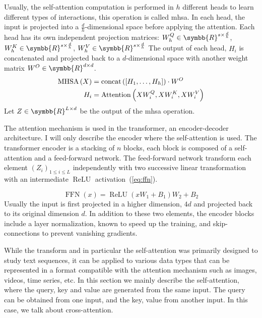 \documentclass[../main.tex]{subfiles}
\begin{document}
	 Usually, the self-attention computation is performed in \(h\) different heads to learn different types of interactions, this operation is called \gls{mhsa}.
	 In each head, the input is projected into a \(\frac{d}{h}\)-dimensional space before applying the attention.
	 Each head has its own independent projection matrices: \(W^Q_h \in \symbb{R}^{s \times \frac{d}{h}}\), \(W^K_h \in \symbb{R}^{s \times \frac{d}{h}}\), \(W^V_h \in \symbb{R}^{s \times \frac{d}{h}}\)
	 The output of each head, \(H_i\) is concatenated and projected back to a \(d\)-dimensional space with another weight matrix \(W^O \in \symbb{R}^{d \times d}\).
	 \begin{align}
		 \operatorname{MHSA}\left(X\right) & = \operatorname{concat}\left(\left[H_1, \ldots, H_h \right] \right)\cdot W^O \\
		 H_i                 & = \operatorname{Attention}\left(XW^Q_i, XW^K_i, XW^V_i\right)
	 \end{align}
	 Let \(Z \in \symbb{R}^{L \times d}\) be the output of the \gls{mhsa} operation.

	 The attention mechanism is used in the transformer, an encoder-decoder architecture.
	 I will only describe the encoder where the self-attention is used.
	 The transformer encoder is a stacking of \(n\) blocks, each block is composed of a self-attention and a feed-forward network.
	 The feed-forward network transform each element \({\left(Z_i\right)}_{1 \leq i \leq L}\) independently with two successive linear transformation with an intermediate \(\operatorname{ReLU}\) activation~(\cref{eq:ffn}).

	 \begin{equation}
		 \operatorname{FFN}\left(x\right) = \operatorname{ReLU}\left(xW_1 + B_1\right)W_2 + B_2 \label{eq:ffn}
	 \end{equation}
	 Usually the input is first projected in a higher dimension, \(4d\) and projected back to its original dimension \(d\).
	 In addition to these two elements, the encoder blocks include a layer normalization, known to speed up the training, and skip-connections to prevent vanishing gradients.

	 While the transform and in particular the self-attention was primarily designed to study text sequences, it can be applied to various data types that can be represented in a format compatible with the attention mechanism such as images, videos, time series, etc.
	 In this section we mainly describe the self-attention, where the query, key and value are generated from the same input.
	 The query can be obtained from one input, and the key, value from another input.
	 In this case, we talk about cross-attention.
\end{document}
